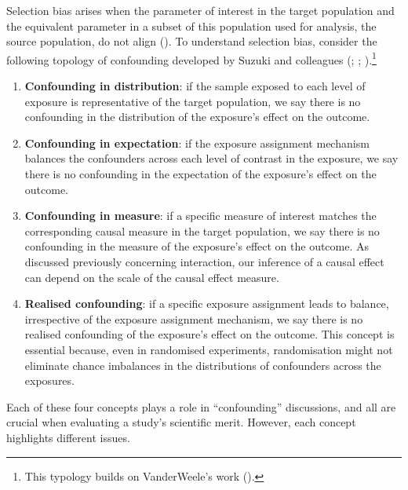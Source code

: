\documentclass[
  singlecolumn]{article}
\begin{document}
Selection bias arises when the parameter of interest in the target
population and the equivalent parameter in a subset of this population
used for analysis, the source population, do not align
(). To understand selection
bias, consider the following topology of confounding developed by Suzuki
and colleagues (;
;
).\footnote{This
  typology builds on VanderWeele's work
  ().}

\begin{enumerate}
\def\labelenumi{\arabic{enumi}.}
\item
  \textbf{Confounding in distribution}: if the sample exposed to each
  level of exposure is representative of the target population, we say
  there is no confounding in the distribution of the exposure's effect
  on the outcome.
\item
  \textbf{Confounding in expectation}: if the exposure assignment
  mechanism balances the confounders across each level of contrast in
  the exposure, we say there is no confounding in the expectation of the
  exposure's effect on the outcome.
\item
  \textbf{Confounding in measure}: if a specific measure of interest
  matches the corresponding causal measure in the target population, we
  say there is no confounding in the measure of the exposure's effect on
  the outcome. As discussed previously concerning interaction, our
  inference of a causal effect can depend on the scale of the causal
  effect measure.
\item
  \textbf{Realised confounding}: if a specific exposure assignment leads
  to balance, irrespective of the exposure assignment mechanism, we say
  there is no realised confounding of the exposure's effect on the
  outcome. This concept is essential because, even in randomised
  experiments, randomisation might not eliminate chance imbalances in
  the distributions of confounders across the exposures.
\end{enumerate}

Each of these four concepts plays a role in ``confounding'' discussions,
and all are crucial when evaluating a study's scientific merit. However,
each concept highlights different issues.
\end{document}

